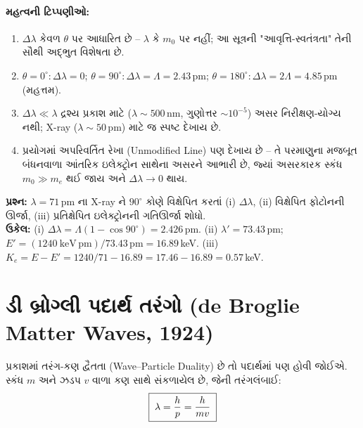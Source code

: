 \paragraph{મહત્વની ટિપ્પણીઓ:}
\begin{enumerate}
  \item $\Delta\lambda$ કેવળ $\theta$ પર આધારિત છે -- $\lambda$ કે $m_0$ પર નહીં; આ
        સૂત્રની "આવૃત્તિ-સ્વતંત્રતા" તેની સૌથી અદ્ભુત વિશેષતા છે.
  \item $\theta=0^\circ:\Delta\lambda=0$; \quad $\theta=90^\circ:\Delta\lambda=\Lambda=2.43\,$pm;
        \quad $\theta=180^\circ:\Delta\lambda=2\Lambda=4.85\,$pm (મહત્તમ).
  \item $\Delta\lambda\ll\lambda$ દ્રશ્ય પ્રકાશ માટે ($\lambda\sim500\,$nm, ગુણોત્તર
        $\sim10^{-5}$) અસર નિરીક્ષણ-યોગ્ય નથી; X-ray ($\lambda\sim50\,$pm) માટે જ
        સ્પષ્ટ દેખાય છે.
  \item પ્રયોગમાં અપરિવર્તિત રેખા (Unmodified Line) પણ દેખાય છે -- તે પરમાણુના
        મજબૂત બંધનવાળા આંતરિક ઇલેક્ટ્રોન સાથેના અસરને આભારી છે, જ્યાં અસરકારક સ્કંધ
        $m_0\gg m_e$ થઈ જાય અને $\Delta\lambda\to0$ થાય.
\end{enumerate}

\begin{udaharan}[1.4]
\textbf{પ્રશ્ન:} $\lambda=71\,$pm ના X-ray ને $90^\circ$ કોણે વિક્ષેપિત કરતાં (i) $\Delta\lambda$,
(ii) વિક્ષેપિત ફોટોનની ઊર્જા, (iii) પ્રતિક્ષેપિત ઇલેક્ટ્રોનની ગતિઊર્જા શોધો.\\[1mm]
\textbf{ઉકેલ:} (i) $\Delta\lambda=\Lambda(1-\cos90^\circ)=2.426\,$pm.
(ii) $\lambda'=73.43\,$pm; $E'=(1240\ \mathrm{keV\,pm})/73.43\,\mathrm{pm}=16.89\,$keV.
(iii) $K_e=E-E'=1240/71-16.89=17.46-16.89=0.57\,$keV.
\end{udaharan}

\section{ડી બ્રોગ્લી પદાર્થ તરંગો (de Broglie Matter Waves, 1924)}

\begin{pramey}
પ્રકાશમાં તરંગ-કણ દ્વૈતતા (Wave--Particle Duality) છે તો પદાર્થમાં પણ હોવી જોઈએ. સ્કંધ $m$ અને
ઝડપ $v$ વાળા કણ સાથે  સંકળાયેલ છે, જેની તરંગલંબાઈ:
\begin{equation}
  \boxed{\;\lambda=\frac{h}{p}=\frac{h}{mv}\;}
\end{equation}
\end{pramey}

